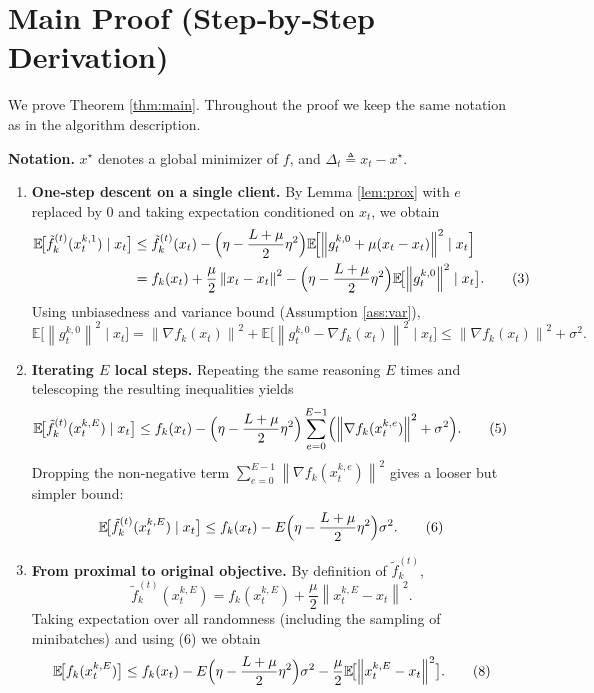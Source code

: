\documentclass{article}
\newcommand{\E}{\mathbb{E}}
\newcommand{\norm}[1]{\left\lVert #1\right\rVert}
\begin{document}
\section*{Main Proof (Step‑by‑Step Derivation)}
We prove Theorem \ref{thm:main}. Throughout the proof we keep the same notation as in the algorithm description.  

\noindent\textbf{Notation.} $x^\star$ denotes a global minimizer of $f$, and $\Delta_t\triangleq x_t-x^\star$.

\begin{enumerate}[label=[Step \arabic*], leftmargin=*]
\item \textbf{One‑step descent on a single client.}  
    By Lemma \ref{lem:prox} with $e$ replaced by $0$ and taking expectation conditioned on $x_t$, we obtain
    \begin{align}
    \E\!\bigl[\tilde f_k^{(t)}(x_{t}^{k,1})\mid x_t\bigr]
    &\le \tilde f_k^{(t)}(x_t)-\Bigl(\eta-\frac{L+\mu}{2}\eta^2\Bigr)
      \E\!\Bigl[\norm{g_{t}^{k,0}+\mu(x_t-x_t)}^2\mid x_t\Bigr] \nonumber\\
    &= f_k(x_t)+\frac{\mu}{2}\norm{x_t-x_t}^2
      -\Bigl(\eta-\frac{L+\mu}{2}\eta^2\Bigr)\E\!\bigl[\norm{g_{t}^{k,0}}^2\mid x_t\bigr] .
    \tag{3}
    \end{align}
    Using unbiasedness and variance bound (Assumption \ref{ass:var}),
    \[
    \E\!\bigl[\norm{g_{t}^{k,0}}^2\mid x_t\bigr]
    = \norm{\nabla f_k(x_t)}^2+\E\!\bigl[\norm{g_{t}^{k,0}-\nabla f_k(x_t)}^2\mid x_t\bigr]
    \le \norm{\nabla f_k(x_t)}^2+\sigma^2 .
    \tag{4}
    \]

\item \textbf{Iterating $E$ local steps.}  
    Repeating the same reasoning $E$ times and telescoping the resulting inequalities yields
    \begin{align}
    \E\!\bigl[\tilde f_k^{(t)}(x_{t}^{k,E})\mid x_t\bigr]
    &\le f_k(x_t)-\Bigl(\eta-\frac{L+\mu}{2}\eta^2\Bigr)
      \sum_{e=0}^{E-1}\Bigl(\norm{\nabla f_k(x_{t}^{k,e})}^2+\sigma^2\Bigr) .
    \tag{5}
    \end{align}
    Dropping the non‑negative term $\sum_{e=0}^{E-1}\norm{\nabla f_k(x_{t}^{k,e})}^2$ gives a looser but simpler bound:
    \[
    \E\!\bigl[\tilde f_k^{(t)}(x_{t}^{k,E})\mid x_t\bigr]
    \le f_k(x_t)-E\Bigl(\eta-\frac{L+\mu}{2}\eta^2\Bigr)\sigma^2 .
    \tag{6}
    \]

\item \textbf{From proximal to original objective.}  
    By definition of $\tilde f_k^{(t)}$,
    \[
    \tilde f_k^{(t)}(x_{t}^{k,E}) = f_k(x_{t}^{k,E})+\frac{\mu}{2}\norm{x_{t}^{k,E}-x_t}^2 .
    \tag{7}
    \]
    Taking expectation over all randomness (including the sampling of minibatches) and using (6) we obtain
    \begin{equation}
    \E\!\bigl[f_k(x_{t}^{k,E})\bigr]
    \le f_k(x_t)-E\Bigl(\eta-\frac{L+\mu}{2}\eta^2\Bigr)\sigma^2
    -\frac{\mu}{2}\E\!\bigl[\norm{x_{t}^{k,E}-x_t}^2\bigr] .
    \tag{8}
    \end{equation}


\end{enumerate}
\end{document}

